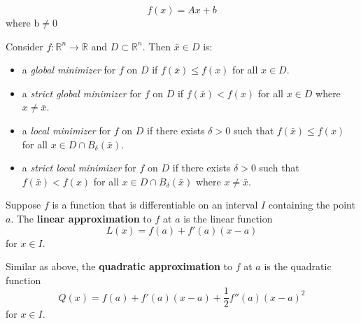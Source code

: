\begin{definition}[affine]
\begin{equation}
    f(x) = Ax + b
\end{equation}
where b$\neq$0

\end{definition}
\begin{definition}
    Consider \(f : \mathbb{R}^n \rightarrow \mathbb{R}\) and \(D \subset \mathbb{R}^n\). Then \(\bar{x} \in D\) is:

\begin{itemize}
    \item a \textit{global minimizer} for \(f\) on \(D\) if \(f(\bar{x}) \leq f(x)\) for all \(x \in D\).
    \item a \textit{strict global minimizer} for \(f\) on \(D\) if \(f(\bar{x}) < f(x)\) for all \(x \in D\) where \(x \neq \bar{x}\).
    \item a \textit{local minimizer} for \(f\) on \(D\) if there exists \(\delta > 0\) such that \(f(\bar{x}) \leq f(x)\) for all \(x \in D \cap B_\delta(\bar{x})\).
    \item a \textit{strict local minimizer} for \(f\) on \(D\) if there exists \(\delta > 0\) such that \(f(\bar{x}) < f(x)\) for all \(x \in D \cap B_\delta(\bar{x})\) where \(x \neq \bar{x}\).
\end{itemize}
\end{definition}
\begin{definition}
    Suppose $f$ is a function that is differentiable on an interval $I$ containing the point $a$. The \textbf{linear approximation} to $f$ at $a$ is the linear function $$L(x) = f(a) + f'(a)(x-a)$$ for $x \in I$.
\end{definition}
\begin{definition}
    Similar as above, the \textbf{quadratic approximation} to $f$ at $a$ is the quadratic function $$Q(x) = f(a) + f'(a)(x-a) + \frac{1}{2}f''(a)(x-a)^2$$ for $x \in I$.
\end{definition}
% 

